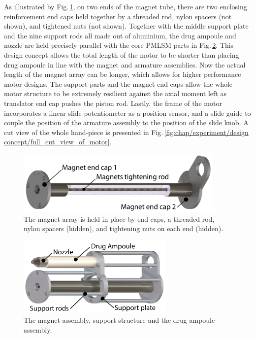     
    As illustrated by Fig.\,\ref{fig:chap/experiment/design concept/magnet_stainlessSteelTube_endCap}, on two ends of the magnet tube, there are two enclosing reinforcement end caps held together by a threaded rod, nylon spacers (not shown), and tightened nuts (not shown). Together with the middle support plate and the nine support rods all made out of aluminium, the drug ampoule and nozzle are held precisely parallel with the core \acs{PMLSM} parts in Fig.\,\ref{fig:chap/experiment/design concept/magnetAssembly_supportStructure}. This design concept allows the total length of the motor to be shorter than placing drug ampoule in line with the magnet and armature assemblies. Now the actual length of the magnet array can be longer, which allows for higher performance motor designs. The support parts and the magnet end caps allow the whole motor structure to be extremely resilient against the axial moment left as translator end cap pushes the piston rod. Lastly, the frame of the motor incorporates a linear slide potentiometer as a position sensor, and a slide guide to couple the position of the armature assembly to the position of the slide knob. A cut view of the whole hand-piece is presented in Fig.\,\ref{fig:chap/experiment/design concept/full_cut_view_of_motor}.
    
    
    \begin{figure}[h]
        \centering
        \includegraphics[width=4in]{chap5/images_concept/magnet_stainlessSteelTube_endCap.pdf}
        \caption{The magnet array is held in place by end caps, a threaded rod, nylon spacers (hidden), and tightening nuts on each end (hidden).}
        \label{fig:chap/experiment/design concept/magnet_stainlessSteelTube_endCap}
    \end{figure}
    
 
    \begin{figure}[h]
        \centering
        \includegraphics[width=3in]{chap5/images_concept/magnetAssembly_supportStructure.pdf}
        \caption{The magnet assembly, support structure and the drug ampoule assembly.}
        \label{fig:chap/experiment/design concept/magnetAssembly_supportStructure}
    \end{figure}
    
